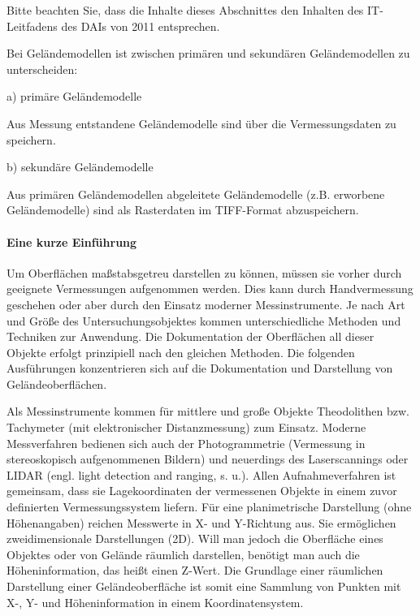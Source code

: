 %
%
Bitte beachten Sie, dass die Inhalte dieses Abschnittes den Inhalten des IT-Leitfadens des DAIs von 2011 entsprechen.
\begin{center}
\tib{\rule{0.9\textwidth}{0.2mm}}\vspace{3mm}
\end{center}

Bei Geländemodellen ist zwischen primären und sekundären Geländemodellen zu unterscheiden:

a) primäre Geländemodelle

Aus Messung entstandene Geländemodelle sind über die Vermessungsdaten zu speichern.

b) sekundäre Geländemodelle

Aus primären Geländemodellen abgeleitete Geländemodelle (z.B. erworbene Geländemodelle) sind als Rasterdaten im TIFF-Format abzuspeichern.

\paragraph{Eine kurze Einführung}
Um Oberflächen maßstabsgetreu darstellen zu können, müssen sie vorher durch geeignete Vermessungen aufgenommen werden. Dies kann durch Handvermessung geschehen oder aber durch den Einsatz moderner Messinstrumente. Je nach Art und Größe des Untersuchungsobjektes kommen unterschiedliche Methoden und Techniken zur Anwendung. Die Dokumentation der Oberflächen all dieser Objekte erfolgt prinzipiell nach den gleichen Methoden. Die folgenden Ausführungen konzentrieren sich auf die Dokumentation und Darstellung von Geländeoberflächen.

Als Messinstrumente kommen für mittlere und große Objekte Theodolithen bzw. Tachymeter (mit elektronischer Distanzmessung) zum Einsatz. Moderne Messverfahren bedienen sich auch der Photogrammetrie (Vermessung in stereoskopisch aufgenommenen Bildern) und neuerdings des Laserscannings oder LIDAR (engl. light detection and ranging, s. u.). Allen Aufnahmeverfahren ist gemeinsam, dass sie Lagekoordinaten der vermessenen Objekte in einem zuvor definierten Vermessungssystem liefern. Für eine planimetrische Darstellung (ohne Höhenangaben) reichen Messwerte in X- und Y-Richtung aus. Sie ermöglichen zweidimensionale Darstellungen (2D). Will man jedoch die Oberfläche eines Objektes oder von Gelände räumlich darstellen, benötigt man auch die Höheninformation, das heißt einen Z-Wert. Die Grundlage einer räumlichen Darstellung einer Geländeoberfläche ist somit eine Sammlung von Punkten mit X-, Y- und Höheninformation in einem Koordinatensystem.

